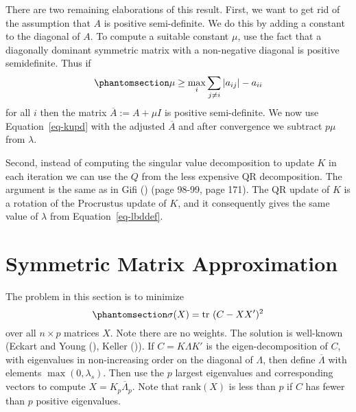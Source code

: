 \documentclass[
  12pt,
  letterpaper,
  DIV=11,
  numbers=noendperiod]{scrartcl}
\newcommand{\sectionbreak}{\clearpage}
\begin{document}
There are two remaining elaborations of this result. First, we want to
get rid of the assumption that \(A\) is positive semi-definite. We do
this by adding a constant to the diagonal of \(A\). To compute a
suitable constant \(\mu\), use the fact that a diagonally dominant
symmetric matrix with a non-negative diagonal is positive semidefinite.
Thus if \begin{equation}\phantomsection\label{eq-mubnd}{
\mu\geq\max_i\sum_{j\not= i}|a_{ij}|-a_{ii}
}\end{equation} for all \(i\) then the matrix \(\overline{A}:=A+\mu I\)
is positive semi-definite. We now use Equation~\ref{eq-kupd} with the
adjusted \(\overline{A}\) and after convergence we subtract \(p\mu\)
from \(\lambda\).

Second, instead of computing the singular value decomposition to update
\(K\) in each iteration we can use the \(Q\) from the less expensive QR
decomposition. The argument is the same as in Gifi
() (page 98-99, page 171). The QR update
of \(K\) is a rotation of the Procrustus update of \(K\), and it
consequently gives the same value of \(\lambda\) from
Equation~\ref{eq-lbddef}.

\sectionbreak

\section{Symmetric Matrix Approximation}\label{sec-symmat}

The problem in this section is to minimize
\begin{equation}\phantomsection\label{eq-eydef}{
\sigma(X)=\text{tr}\ (C-XX')^2
}\end{equation} over all \(n\times p\) matrices \(X\). Note there are no
weights. The solution is well-known (Eckart and Young
(), Keller
()). If \(C=K\Lambda K'\) is the
eigen-decomposition of \(C\), with eigenvalues in non-increasing order
on the diagonal of \(\Lambda\), then define \(\overline{\Lambda}\) with
elements \(\max(0,\lambda_s)\). Then use the \(p\) largest eigenvalues
and corresponding vectors to compute \(X=K_p\overline{\Lambda}_p\). Note
that \(\text{rank}(X)\) is less than \(p\) if \(C\) has fewer than \(p\)
positive eigenvalues.
\end{document}
